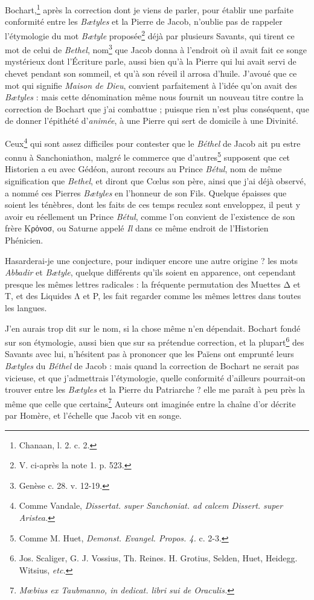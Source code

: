 \documentclass[a4paper, 11pt, oneside, polutonikogreek, french, landscape]{article}
\begin{document}
Bochart,\footnote{Chanaan, l. 2. c. 2.} après la correction dont je viens de parler, pour établir une parfaite conformité entre les \emph{Bætyles} et la Pierre de Jacob, n'oublie pas de rappeler l'étymologie du mot \emph{Bætyle} proposée\footnote{V. ci-après la note 1. p. 523.} déjà par plusieurs Savants, qui tirent ce mot de celui de \emph{Bethel}, nom\footnote{Genèse c. 28. v. 12-19.} que Jacob donna à l'endroit où il avait fait ce songe mystérieux dont l'Écriture parle, aussi bien qu'à la Pierre qui lui avait servi de chevet pendant son sommeil, et qu'à son réveil il arrosa d'huile. J'avoué que ce mot qui signifie \emph{Maison de Dieu}, convient parfaitement à l'idée qu'on avait des \emph{Bætyles} : mais cette dénomination même nous fournit un nouveau titre contre la correction de Bochart que j'ai combattue ; puisque rien n'est plus conséquent, que de donner l'épithété d'\emph{animée}, à une Pierre qui sert de domicile à une Divinité.

Ceux\footnote{Comme Vandale, \emph{Dissertat. super Sanchoniat. ad calcem Dissert. super Aristea.}} qui sont assez difficiles pour contester que le \emph{Béthel} de Jacob ait pu estre connu à Sanchoniathon, malgré le commerce que d'autres\footnote{Comme M. Huet, \emph{Demonst. Evangel. Propos. 4.} c. 2-3.} supposent que cet Historien a eu avec Gédéon, auront recours au Prince \emph{Bétul}, nom de même signification que \emph{Bethel}, et diront que Cœlus son père, ainsi que j'ai déjà observé, a nommé ces Pierres \emph{Bætyles} en l'honneur de son Fils. Quelque épaisses que soient les ténèbres, dont les faits de ces temps reculez sont enveloppez, il peut y avoir eu réellement un Prince \emph{Bétul}, comme l'on convient de l'existence de son frère Κρὁνοσ, ou Saturne appelé \emph{Il} dans ce même endroit de l'Historien Phénicien.

Hasarderai-je une conjecture, pour indiquer encore une autre origine ? les mots \emph{Abbadir} et \emph{Bætyle}, quelque différents qu'ils soient en apparence, ont cependant presque les mêmes lettres radicales : la fréquente permutation des Muettes Δ et T, et des Liquides Λ et P, les fait regarder comme les mêmes lettres dans toutes les langues.

J'en aurais trop dit sur le nom, si la chose même n'en dépendait. Bochart fondé sur son étymologie, aussi bien que sur sa prétendue correction, et la plupart\footnote{Jos. Scaliger, G. J. Vossius, Th. Reines. H. Grotius, Selden, Huet, Heidegg. Witsius, \emph{etc.}} des Savants avec lui, n'hésitent pas à prononcer que les Païens ont emprunté leurs \emph{Bætyles} du \emph{Béthel} de Jacob : mais quand la correction de Bochart ne serait pas vicieuse, et que j'admettrais l'étymologie, quelle conformité d'ailleurs pourrait-on trouver entre les \emph{Bætyles} et la Pierre du Patriarche ? elle me paraît à peu près la même que celle que certains\footnote{\emph{Mœbius ex Taubmanno, in dedicat. libri sui de Oraculis.}} Auteurs ont imaginée entre la chaîne d'or décrite par Homère, et l'échelle que Jacob vit en songe. 
\end{document}
